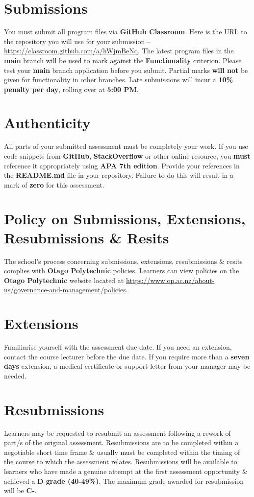 \documentclass{article}
\begin{document}
\section*{Submissions}
You must submit all program files via \textbf{GitHub Classroom}. Here is the URL to the repository you will use for your submission – \href{https://classroom.github.com/a/hWjmBeNq}{https://classroom.github.com/a/hWjmBeNq}. The latest program files in the \textbf{main} branch will be used to mark against the \textbf{Functionality} criterion. Please test your \textbf{main} branch application before you submit. Partial marks \textbf{will not} be given for functionality in other branches. Late submissions will incur a \textbf{10\% penalty per day}, rolling over at \textbf{5:00 PM}.

\section*{Authenticity}
All parts of your submitted assessment must be completely your work. If you use code snippets from \textbf{GitHub}, \textbf{StackOverflow} or other online resource, you \textbf{must} reference it appropriately using \textbf{APA 7th edition}. Provide your references in the \textbf{README.md} file in your repository. Failure to do this will result in a mark of \textbf{zero} for this assessment.

\section*{Policy on Submissions, Extensions, Resubmissions \& Resits}
The school's process concerning submissions, extensions, resubmissions \& resits complies with \textbf{Otago Polytechnic} policies. Learners can view policies on the \textbf{Otago Polytechnic} website located at \href{https://www.op.ac.nz/about-us/governance-and-management/policies}{https://www.op.ac.nz/about-us/governance-and-management/policies}.

\section*{Extensions}
Familiarise yourself with the assessment due date. If you need an extension, contact the course lecturer before the due date. If you require more than a \textbf{seven days} extension, a medical certificate or support letter from your manager may be needed.

\section*{Resubmissions}
Learners may be requested to resubmit an assessment following a rework of part/s of the original assessment. Resubmissions are to be completed within a negotiable short time frame \& usually must be completed within the timing of the course to which the assessment relates. Resubmissions will be available to learners who have made a genuine attempt at the first assessment opportunity \& achieved a \textbf{D grade (40-49\%)}. The maximum grade awarded for resubmission will be \textbf{C-}.
\end{document}
